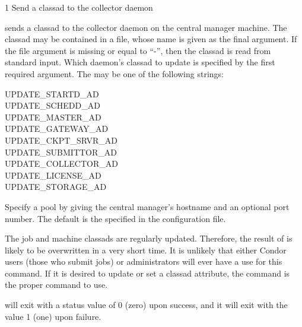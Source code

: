\begin{ManPage}{\label{man-condor-advertise}}{1}
{Send a classad to the collector daemon}
\Synopsis {}
\ToolArgsBase
{}


\Description
{} sends a classad to the collector daemon on
the central manager machine.
The classad may be contained in a file,
whose name is given as the final argument. If the file
argument is missing or equal to ``-'', then the classad is read
from standard input.
Which daemon's classad to update is specified by the first
required argument.
The  may be one of the following strings:
\begin{description}
\item[UPDATE\_STARTD\_AD]
\item[UPDATE\_SCHEDD\_AD]
\item[UPDATE\_MASTER\_AD]
\item[UPDATE\_GATEWAY\_AD]
\item[UPDATE\_CKPT\_SRVR\_AD]
\item[UPDATE\_SUBMITTOR\_AD]
\item[UPDATE\_COLLECTOR\_AD]
\item[UPDATE\_LICENSE\_AD]
\item[UPDATE\_STORAGE\_AD]
\end{description}

\begin{Options}
    \ToolArgsBaseDesc
            {Specify a pool by
            giving the central manager's hostname and an optional port
	    number.  The default is the
	     specified in the configuration file.}
\end{Options}

\GenRem
The job and machine classads are regularly updated.
Therefore, the result of  is likely to be
overwritten in a very short time.
It is unlikely that either Condor users (those who submit jobs)
or administrators will ever have a use for this command.
If it is desired to update or set a classad attribute, the
 command is the proper command to use.

\ExitStatus

 will exit with a status value of 0 (zero) upon success,
and it will exit with the value 1 (one) upon failure.

\end{ManPage}
